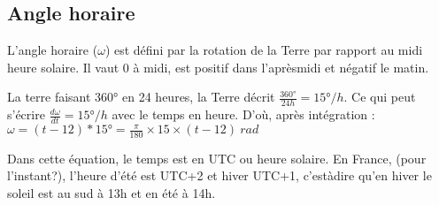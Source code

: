 \documentclass[letterpaper,10pt,english]{sphinxmanual}
\begin{document}
\noindent{}


\subsection{Angle horaire}
\label{\detokenize{Part3/EmplacementSoleil:angle-horaire}}
L’angle horaire (\(\omega\)) est défini par la rotation de la Terre par rapport au midi heure solaire. Il vaut 0 à midi, est positif dans l’après\sphinxhyphen{}midi et négatif le matin.

La terre faisant 360° en 24 heures, la Terre décrit \(\frac{360 ° }{24h}=15°/h\). Ce qui peut s’écrire \(\frac{d \omega}{dt}=15°/h\) avec  le temps en heure. D’où, après intégration : \(\omega = (t-12)*15 °= \frac{\pi}{180} \times 15 \times (t-12) \ rad \)

Dans cette équation, le temps est en UTC ou heure solaire. En France, (pour l’instant?), l’heure d’été est UTC+2 et hiver UTC+1, c’est\sphinxhyphen{}à\sphinxhyphen{}dire qu’en hiver le soleil est au sud à 13h et en été à 14h.

\begin{sphinxVerbatim}[commandchars=\\\{\}]
   
 \PYG{p}{[}\PYG{p}{[}    \PYG{p}{]}\PYG{p}{[}    \PYG{p}{]}\PYG{p}{]}
  \PYG{p}{[}\PYG{p}{]}
     
\end{sphinxVerbatim}
\end{document}
